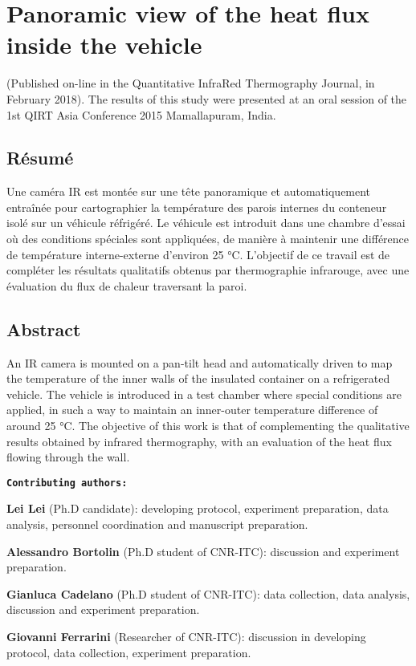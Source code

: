 \chapter{Panoramic view of the heat flux inside the vehicle}     %
(Published on-line  in the Quantitative InfraRed Thermography Journal, in February 2018).
The results of this study were presented at an oral session of the 1st QIRT Asia Conference 2015 Mamallapuram, India. %
\section*{Résumé}
Une caméra IR est montée sur une tête panoramique et automatiquement entraînée pour cartographier la température des parois internes du conteneur isolé sur un véhicule réfrigéré. Le véhicule est introduit dans une chambre d'essai où des conditions spéciales sont appliquées, de manière à maintenir une différence de température interne-externe d'environ 25 °C. L'objectif de ce travail est de compléter les résultats qualitatifs obtenus par thermographie infrarouge, avec une évaluation du flux de chaleur traversant la paroi.

\section*{Abstract}
An IR camera is mounted on a pan-tilt head and automatically driven to map the temperature of the inner walls of the insulated container on a refrigerated vehicle. The vehicle is introduced in a test chamber where special conditions are applied, in such a way to maintain an inner-outer temperature difference of around 25 °C. The objective of this work is that of complementing the qualitative results obtained by infrared thermography, with an evaluation of the heat flux flowing through the wall.

\textbf{\texttt{Contributing authors:}}

\textbf{\textsf{Lei Lei}} (Ph.D candidate): developing protocol, experiment preparation, data analysis,  personnel coordination and manuscript preparation.

\textbf{Alessandro Bortolin} (Ph.D student of CNR-ITC): discussion and experiment preparation.

\textbf{Gianluca Cadelano} (Ph.D student of CNR-ITC): data collection, data analysis, discussion and experiment preparation.

\textbf{Giovanni Ferrarini} (Researcher of CNR-ITC): discussion in developing protocol, data collection, experiment preparation.

